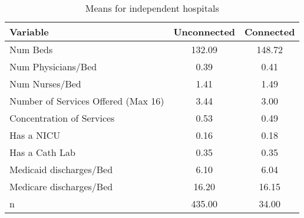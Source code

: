 \begin{table}[ht!]
\centering
\caption{Means for independent hospitals}
\centering
\begin{tabular}[t]{lcc}
\toprule
Variable & Unconnected & Connected\\
\midrule
Num Beds & 132.09 & 148.72\\
Num Physicians/Bed & 0.39 & 0.41\\
Num Nurses/Bed & 1.41 & 1.49\\
Number of Services Offered (Max 16) & 3.44 & 3.00\\
Concentration of Services & 0.53 & 0.49\\
\addlinespace
Has a NICU & 0.16 & 0.18\\
Has a Cath Lab & 0.35 & 0.35\\
Medicaid discharges/Bed & 6.10 & 6.04\\
Medicare discharges/Bed & 16.20 & 16.15\\
n & 435.00 & 34.00\\
\bottomrule
\end{tabular}
\end{table}
